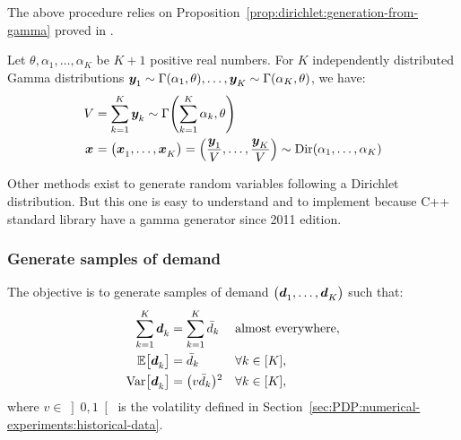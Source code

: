The above procedure relies on Proposition~\ref{prop:dirichlet:generation-from-gamma} proved in \cite{Devroye1986}.

\begin{prop}\label{prop:dirichlet:generation-from-gamma}
  Let $\theta,\alpha_1,\ldots,\alpha_K$ be $K+1$ positive real numbers.
  For $K$ independently distributed Gamma distributions
  $\va y_1\sim\Gamma\bracket{\alpha_1,\theta},\ldots,\va y_K\sim\Gamma\bracket{\alpha_K,\theta}$,
  we have:
  \begin{subequations}
    \begin{align*}
      V &= \sum_{k=1}^K \va y_k \sim \Gamma\bracket{\sum_{k=1}^K \alpha_k,\theta}
      \\
      \va x &= \bracket{\va x_1,\ldots,\va x_K} = \bracket{\frac{\va y_1}{V},\ldots,\frac{\va y_K}{V}} \sim \Dir\bracket{\alpha_1,\ldots,\alpha_K}
    \end{align*}
  \end{subequations}
\end{prop}

Other methods exist to generate random variables following a Dirichlet distribution. But this one is easy to understand and to implement because C++ standard library have a gamma generator since 2011 edition.




\subsubsection{Generate samples of demand}

The objective is to generate samples of demand $\bracket{\va\demand_1,\ldots,\va\demand_K}$ such that:
\begin{subequations}
  \begin{align}
    \sum_{k=1}^K \va\demand_k &= \sum_{k=1}^K \bar{\demand}_k && \mbox{almost everywhere},
    \\
    \espe\sqbracket{\va\demand_k} &= \bar{\demand}_k && \forall k\in\range{K},
    \\
    \vari\sqbracket{\va\demand_k} &= \bracket{v\bar{\demand}_k}^2 && \forall k\in\range{K},
  \end{align}
\end{subequations}
where $v\in\left]0,1\right[$ is the volatility defined in Section~\ref{sec:PDP:numerical-experiments:historical-data}.


\medskip

